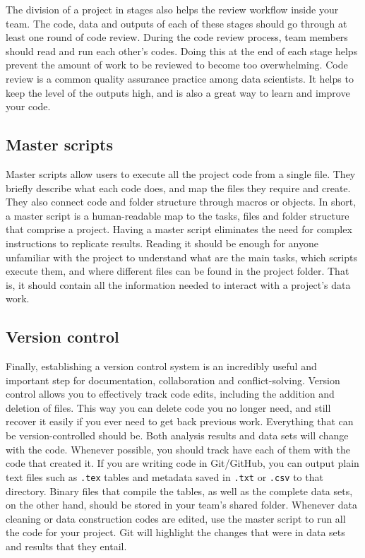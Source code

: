 The division of a project in stages also helps the review workflow inside your team.
The code, data and outputs of each of these stages should go through at least one round of code review.
During the code review process, team members should read and run each other's codes.
Doing this at the end of each stage helps prevent the amount of work to be reviewed to become too overwhelming.
Code review is a common quality assurance practice among data scientists.
It helps to keep the level of the outputs high, and is also a great way to learn and improve your code.

\subsection{Master scripts}

Master scripts allow users to execute all the project code from a single file.
They briefly describe what each code does, 
and map the files they require and create. 
They also connect code and folder structure through macros or objects. 
In short, a master script is a human-readable map to the tasks, 
files and folder structure that comprise a project.  
Having a master script eliminates the need for complex instructions to replicate results. 
Reading it should be enough for anyone unfamiliar with the project
to understand what are the main tasks, which scripts execute them,
and where different files can be found in the project folder. 
That is, it should contain all the information needed to interact with a project's data work.

\subsection{Version control}

Finally, establishing a version control system is an incredibly useful 
and important step for documentation, collaboration and conflict-solving.
Version control allows you to effectively track code edits,
including the addition and deletion of files. 
This way you can delete code you no longer need, 
and still recover it easily if you ever need to get back previous work.
Everything that can be version-controlled should be. 
Both analysis results and data sets will change with the code.
Whenever possible, you should track have each of them with the code that created it.
If you are writing code in Git/GitHub,
you can output plain text files such as \texttt{.tex} tables
and metadata saved in \texttt{.txt} or \texttt{.csv} to that directory.
Binary files that compile the tables,
as well as the complete data sets, on the other hand,
should be stored in your team's shared folder. 
Whenever data cleaning or data construction codes are edited,
use the master script to run all the code for your project.
Git will highlight the changes that were in data sets and results that they entail. 

